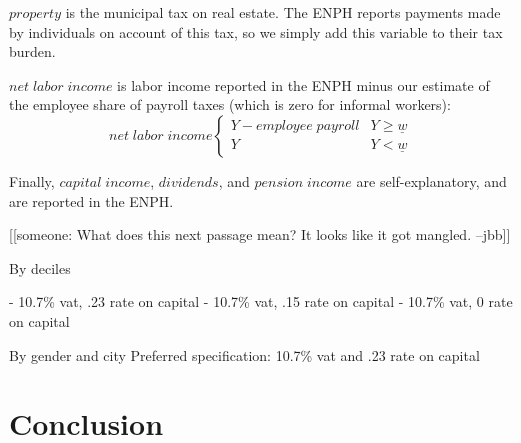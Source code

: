 \documentclass[12pt]{article}
\begin{document}
$property$ is the municipal tax on real estate.
The ENPH reports payments made by individuals on account of this tax,
so we simply add this variable to their tax burden.

$net \; labor \;income$ is labor income reported in the ENPH
minus our estimate of the employee share of payroll taxes
(which is zero for informal workers):
\begin{equation}
net \; labor \;income
  \begin{cases}
	Y - employee \; payroll& Y \geq \underline{w} \\
	Y &  Y < \underline{w}
  \end{cases}
\end{equation}

Finally, $capital \; income$, $dividends$, and $pension \; income$
are self-explanatory, and are reported in the ENPH.

[[someone:
    What does this next passage mean?
    It looks like it got mangled.
    --jbb]]

By deciles

- 10.7\% vat, .23 rate on capital
- 10.7\% vat, .15 rate on capital
- 10.7\% vat,  0 rate on capital

By gender and city
Preferred specification: 10.7\% vat and .23 rate on capital

\section{Conclusion}



\citet{microsim}
\end{document}
